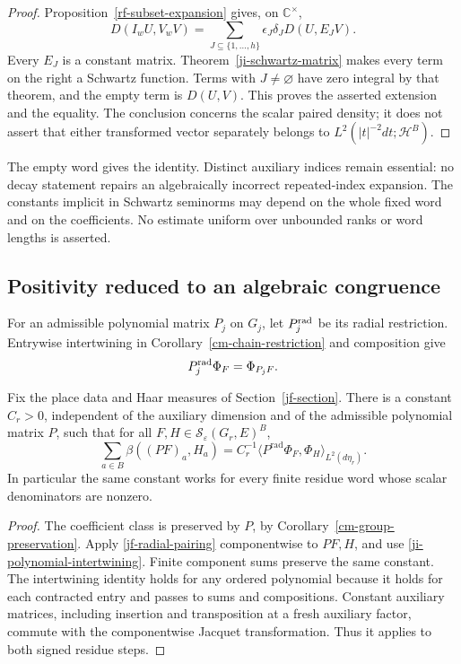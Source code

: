 \begin{proof}
Proposition~\ref{rf-subset-expansion} gives, on
\(\mathbb C^\times\),
\[
 D(I_wU,V_wV)=\sum_{J\subseteq\{1,\ldots,h\}}
                    \epsilon_J\delta_JD(U,E_JV).
\]
Every \(E_J\) is a constant matrix.  Theorem~\ref{ji-schwartz-matrix}
makes every term on the right a Schwartz function.  Terms with
\(J\ne\varnothing\) have zero integral by that theorem, and the
empty term is \(D(U,V)\).  This proves the asserted extension and
the equality.  The conclusion concerns the scalar paired density;
it does not assert that either transformed vector separately belongs
to \(L^2(|t|^{-2}dt;\mathcal H^B)\).
\end{proof}

The empty word gives the identity.  Distinct auxiliary indices
remain essential: no decay statement repairs an algebraically
incorrect repeated-index expansion.  The constants implicit in
Schwartz seminorms may depend on the whole fixed word and on the
coefficients.  No estimate uniform over unbounded ranks or word
lengths is asserted.

\subsection{Positivity reduced to an algebraic congruence}

For an admissible polynomial matrix \(P_j\) on \(G_j\), let
\(P_j^{\rm rad}\) be its radial restriction.  Entrywise
intertwining in Corollary~\ref{cm-chain-restriction} and composition
give
\begin{equation}\label{ji-polynomial-intertwining}
          P_j^{\rm rad}\Phi_F=\Phi_{P_jF}.
\end{equation}

\begin{corollary}\label{ji-word-pairing}
Fix the place data and Haar measures of Section~\ref{jf-section}.
There is a constant \(C_r>0\), independent of the auxiliary dimension
and of the admissible polynomial matrix \(P\), such that for all
\(F,H\in\mathscr S_\varepsilon(G_r,E)^B\),
\[
 \sum_{a\in B}\beta((PF)_a,H_a)
   =C_r^{-1}\langle P^{\mathrm{rad}}\Phi_F,\Phi_H\rangle_{L^2(d\eta_r)}.
\]
In particular the same constant works for every finite residue word
whose scalar denominators are nonzero.
\end{corollary}

\begin{proof}
The coefficient class is preserved by \(P\), by
Corollary~\ref{cm-group-preservation}. Apply
\eqref{jf-radial-pairing} componentwise to \(PF,H\), and use
\eqref{ji-polynomial-intertwining}. Finite component sums preserve the
same constant. The intertwining identity holds for any ordered polynomial
because it holds for each contracted entry and passes to sums and
compositions. Constant auxiliary matrices, including insertion and
transposition at a fresh auxiliary factor, commute with the componentwise
Jacquet transformation. Thus it applies to both signed residue steps.
\end{proof}

